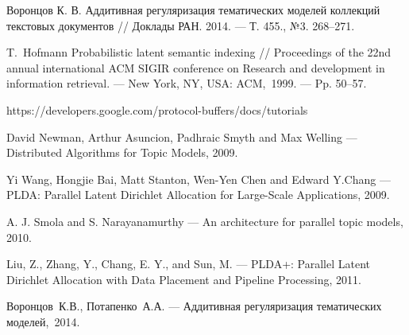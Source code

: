 \documentclass[12pt]{article}
\begin{document}
\newpage
{}
\begin{thebibliography}{00}

Воронцов К. В. Аддитивная регуляризация тематических моделей коллекций текстовых документов // Доклады РАН. 2014. — Т. 455., №3. 268–271.

T.~Hofmann Probabilistic latent semantic indexing // Proceedings of the 22nd annual international
ACM SIGIR conference on Research and development in information retrieval. — New York, NY,
USA: ACM,~1999. — Pp. 50–57.

https://developers.google.com/protocol-buffers/docs/tutorials

David Newman, Arthur Asuncion, Padhraic Smyth and Max Welling --- Distributed Algorithms for Topic Models, 2009.

Yi Wang, Hongjie Bai, Matt Stanton, Wen-Yen Chen and Edward Y.Chang --- PLDA: Parallel Latent Dirichlet Allocation for Large-Scale Applications, 2009.

A. J. Smola and S. Narayanamurthy --- An architecture for parallel topic models, 2010.

Liu, Z., Zhang, Y., Chang, E. Y., and Sun, M. --- PLDA+: Parallel Latent Dirichlet Allocation with Data Placement and Pipeline Processing, 2011.

Воронцов~К.В., Потапенко~А.А. --- Аддитивная регуляризация тематических моделей,~2014.

\end{thebibliography}
\end{document}
